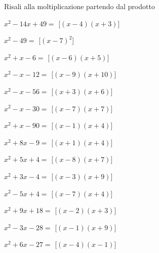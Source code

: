 \begin{esercizio}
 \label{ese:11.11}
Risali alla moltiplicazione partendo dal prodotto

\begin{multicols}{2}
\begin{enumeratea}
\spazielenx
\item \(x^{2} - 14 x + 49=\) 
\hfill [\(\left(x - 4\right) \left(x + 3\right)\)]
\item \(x^{2} - 49=\) 
\hfill [\(\left(x - 7\right)^{2}\)]
\item \(x^{2} + x - 6=\) 
\hfill [\(\left(x - 6\right) \left(x + 5\right)\)]
\item \(x^{2} - x - 12=\) 
\hfill [\(\left(x - 9\right) \left(x + 10\right)\)]
\item \(x^{2} - x - 56=\) 
\hfill [\(\left(x + 3\right) \left(x + 6\right)\)]
\item \(x^{2} - x - 30=\) 
\hfill [\(\left(x - 7\right) \left(x + 7\right)\)]
\item \(x^{2} + x - 90=\) 
\hfill [\(\left(x - 1\right) \left(x + 4\right)\)]
\item \(x^{2} + 8 x - 9=\) 
\hfill [\(\left(x + 1\right) \left(x + 4\right)\)]
\item \(x^{2} + 5 x + 4=\) 
\hfill [\(\left(x - 8\right) \left(x + 7\right)\)]
\item \(x^{2} + 3 x - 4=\) 
\hfill [\(\left(x - 3\right) \left(x + 9\right)\)]
\item \(x^{2} - 5 x + 4=\) 
\hfill [\(\left(x - 7\right) \left(x + 4\right)\)]
\item \(x^{2} + 9 x + 18=\) 
\hfill [\(\left(x - 2\right) \left(x + 3\right)\)]
\item \(x^{2} - 3 x - 28=\) 
\hfill [\(\left(x - 1\right) \left(x + 9\right)\)]
\item \(x^{2} + 6 x - 27=\) 
\hfill [\(\left(x - 4\right) \left(x - 1\right)\)]

\end{enumeratea}
\end{multicols}
\end{esercizio}
